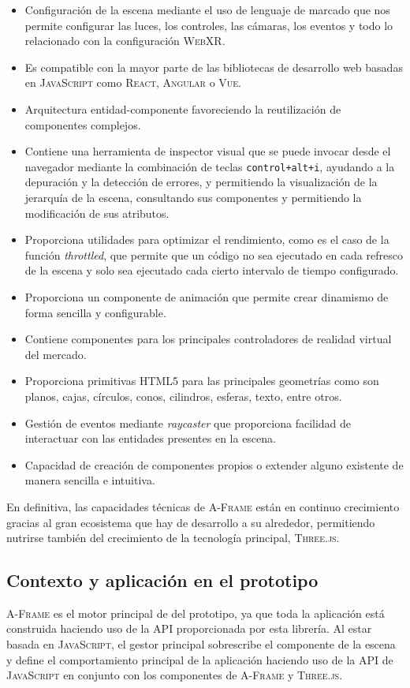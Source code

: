 \documentclass[a4paper, 11pt]{book}
\begin{document}
\begin{itemize}
	\item Configuración de la escena mediante el uso de lenguaje de marcado que nos permite configurar las luces, los controles, las cámaras, los eventos y todo lo relacionado con la configuración \textsc{WebXR}.
	\item Es compatible con la mayor parte de las bibliotecas de desarrollo web basadas en \textsc{JavaScript} como \textsc{React}, \textsc{Angular} o \textsc{Vue}.
	\item Arquitectura entidad-componente favoreciendo la reutilización de componentes complejos.
	\item Contiene una herramienta de inspector visual que se puede invocar desde el navegador mediante la combinación de teclas \texttt{control+alt+i}, ayudando a la depuración y la detección de errores, y permitiendo la visualización de la jerarquía de la escena, consultando sus componentes y permitiendo la modificación de sus atributos.
	\item Proporciona utilidades para optimizar el rendimiento, como es el caso de la función \emph{throttled}, que permite que un código no sea ejecutado en cada refresco de la escena y solo sea ejecutado cada cierto intervalo de tiempo configurado.
	\item Proporciona un componente de animación que permite crear dinamismo de forma sencilla y configurable.
	\item Contiene componentes para los principales controladores de realidad virtual del mercado.
	\item Proporciona primitivas \textsc{HTML5} para las principales geometrías como son planos, cajas, círculos, conos, cilindros, esferas, texto, entre otros.
	\item Gestión de eventos mediante \emph{\gls{raycaster}} que proporciona facilidad de interactuar con las entidades presentes en la escena.
	\item Capacidad de creación de componentes propios o extender alguno existente de manera sencilla e intuitiva.
\end{itemize}

En definitiva, las capacidades técnicas de \textsc{A-Frame} están en continuo crecimiento gracias al gran ecosistema que hay de desarrollo a su alrededor, permitiendo nutrirse también del crecimiento de la tecnología principal, \textsc{Three.js}.
\subsection{Contexto y aplicación en el prototipo}
\textsc{A-Frame} es el motor principal de  del prototipo, ya que toda la aplicación está construida haciendo uso de la \textsc{\gls{API}} proporcionada por esta librería. Al estar basada en \textsc{JavaScript}, el gestor principal sobrescribe el componente de la escena y define el comportamiento principal de la aplicación haciendo uso de la \textsc{API} de \textsc{JavaScript} en conjunto con los componentes de \textsc{A-Frame} y \textsc{Three.js}.
\end{document}
